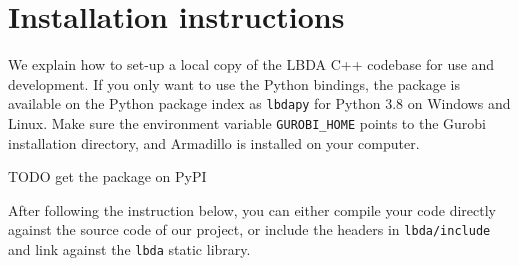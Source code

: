 \documentclass[12pt, english]{article}
\begin{document}
\section{Installation instructions}
\label{sec:installation_instructions}

We explain how to set-up a local copy of the LBDA C++ codebase for use and development. If you only want to use the Python bindings, the package is available on the Python package index as \texttt{lbdapy} for Python 3.8 on Windows and Linux. Make sure the environment variable \texttt{GUROBI\_HOME} points to the Gurobi installation directory, and Armadillo is installed on your computer. 

TODO get the package on PyPI

After following the instruction below, you can either compile your code directly against the source code of our project, or include the headers in \texttt{lbda/include} and link against the \texttt{lbda} static library.
\end{document}
